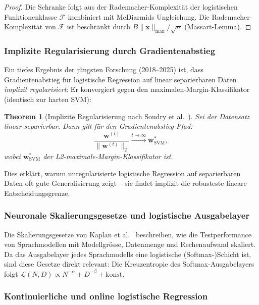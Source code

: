 ﻿\documentclass[12pt, a4paper]{article}
\newtheorem{theorem}{Theorem}[section]
\theoremstyle{definition}
\theoremstyle{remark}
\newcommand{\vw}{\bm{w}}
\newcommand{\vx}{\bm{x}}
\begin{document}
\begin{proof}
  Die Schranke folgt aus der Rademacher-Komplexität der logistischen Funktionenklasse
  $\mathcal{F}$ kombiniert mit McDiarmids Ungleichung. Die Rademacher-Komplexität von
  $\mathcal{F}$ ist beschränkt durch $B\|\vx\|_{\max}/\sqrt{n}$ (Massart-Lemma). 
\end{proof}

\subsubsection{Implizite Regularisierung durch Gradientenabstieg}

Ein tiefes Ergebnis der jüngsten Forschung (2018--2025) ist, dass Gradientenabstieg für
logistische Regression auf linear separierbaren Daten \emph{implizit regularisiert}: Er
konvergiert gegen den maximalen-Margin-Klassifikator (identisch zur harten SVM):

\begin{theorem}[Implizite Regularisierung nach Soudry et al.~\citep{soudry2018implicit}]
  Sei der Datensatz linear separierbar. Dann gilt für den Gradientenabstieg-Pfad:
  \[
    \frac{\vw^{(t)}}{\|\vw^{(t)}\|_2} \xrightarrow{t\to\infty} \vw^*_{\mathrm{SVM}},
  \]
  wobei $\vw^*_{\mathrm{SVM}}$ der L2-maximale-Margin-Klassifikator ist.
\end{theorem}

Dies erklärt, warum unregularisierte logistische Regression auf separierbaren Daten oft
gute Generalisierung zeigt -- sie findet implizit die robusteste lineare Entscheidungsgrenze.

\subsubsection{Neuronale Skalierungsgesetze und logistische Ausgabelayer}

Die Skalierungsgesetze von Kaplan et al.~\citep{kaplan2020scaling} beschreiben, wie die
Testperformance von Sprachmodellen mit Modellgrösse, Datenmenge und Rechenaufwand skaliert.
Da das Ausgabelayer jedes Sprachmodells eine logistische (Softmax-)Schicht ist, sind diese
Gesetze direkt relevant: Die Kreuzentropie des Softmax-Ausgabelayers folgt
$\mathcal{L}(N, D) \propto N^{-\alpha} + D^{-\beta} + \text{konst.}$

\subsubsection{Kontinuierliche und online logistische Regression}
\end{document}
